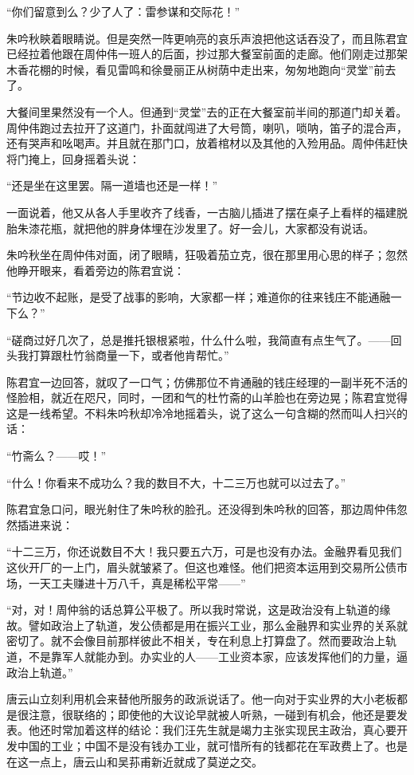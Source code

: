 \par “你们留意到么？少了人了：雷参谋和交际花！”
\par 朱吟秋鿃着眼睛说。但是突然一阵更响亮的哀乐声浪把他这话吞没了，而且陈君宜已经拉着他跟在周仲伟一班人的后面，抄过那大餐室前面的走廊。他们刚走过那架木香花棚的时候，看见雷鸣和徐曼丽正从树荫中走出来，匆匆地跑向“灵堂”前去了。
\par 大餐间里果然没有一个人。但通到“灵堂”去的正在大餐室前半间的那道门却关着。周仲伟跑过去拉开了这道门，扑面就闯进了大号筒，喇叭，唢呐，笛子的混合声，还有哭声和吆喝声。并且就在那门口，放着棺材以及其他的入殓用品。周仲伟赶快将门掩上，回身摇着头说：
\par “还是坐在这里罢。隔一道墙也还是一样！”
\par 一面说着，他又从各人手里收齐了线香，一古脑儿插进了摆在桌子上看样的福建脱胎朱漆花瓶，就把他的胖身体埋在沙发里了。好一会儿，大家都没有说话。
\par 朱吟秋坐在周仲伟对面，闭了眼睛，狂吸着茄立克，很在那里用心思的样子；忽然他睁开眼来，看着旁边的陈君宜说：
\par “节边收不起账，是受了战事的影响，大家都一样；难道你的往来钱庄不能通融一下么？”
\par “磋商过好几次了，总是推托银根紧啦，什么什么啦，我简直有点生气了。——回头我打算跟杜竹翁商量一下，或者他肯帮忙。”
\par 陈君宜一边回答，就叹了一口气；仿佛那位不肯通融的钱庄经理的一副半死不活的怪脸相，就近在咫尺，同时，一团和气的杜竹斋的山羊脸也在旁边晃；陈君宜觉得这是一线希望。不料朱吟秋却冷冷地摇着头，说了这么一句含糊的然而叫人扫兴的话：
\par “竹斋么？——哎！”
\par “什么！你看来不成功么？我的数目不大，十二三万也就可以过去了。”
\par 陈君宜急口问，眼光射住了朱吟秋的脸孔。还没得到朱吟秋的回答，那边周仲伟忽然插进来说：
\par “十二三万，你还说数目不大！我只要五六万，可是也没有办法。金融界看见我们这伙开厂的一上门，眉头就皱紧了。但这也难怪。他们把资本运用到交易所公债市场，一天工夫赚进十万八千，真是稀松平常——”
\par “对，对！周仲翁的话总算公平极了。所以我时常说，这是政治没有上轨道的缘故。譬如政治上了轨道，发公债都是用在振兴工业，那么金融界和实业界的关系就密切了。就不会像目前那样彼此不相关，专在利息上打算盘了。然而要政治上轨道，不是靠军人就能办到。办实业的人——工业资本家，应该发挥他们的力量，逼政治上轨道。”
\par 唐云山立刻利用机会来替他所服务的政派说话了。他一向对于实业界的大小老板都是很注意，很联络的；即使他的大议论早就被人听熟，一碰到有机会，他还是要发表。他还时常加着这样的结论：我们汪先生就是竭力主张实现民主政治，真心要开发中国的工业；中国不是没有钱办工业，就可惜所有的钱都花在军政费上了。也是在这一点上，唐云山和吴荪甫新近就成了莫逆之交。
